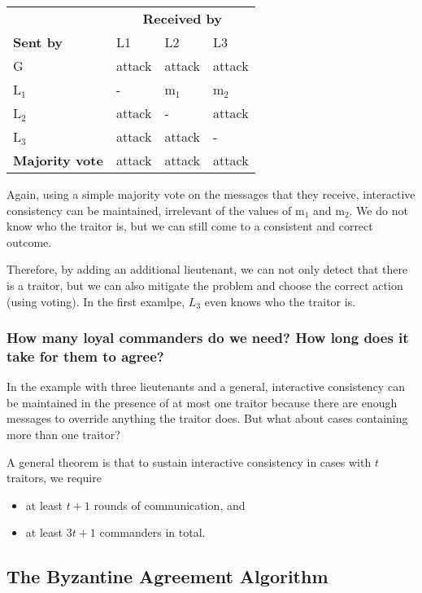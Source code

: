 \begin{center}
\begin{tabular}{llll}
 \hline
  & \multicolumn{3}{c}{{\bf Received by}}\\
 \cline{2-4}
  {\bf Sent by}  & L1 & L2 & L3\\
\hline
 G & attack & attack & attack \\
 L\(_1\) & - & m$_1$ & m$_2$ \\
 L\(_2\) & attack & - & attack \\
 L\(_3\) & attack & attack & - \\
 \hline
{\bf Majority vote} & attack & attack & attack\\
 \hline
\end{tabular}
\end{center}

Again, using a simple majority vote on the messages that they receive,  interactive consistency can be maintained, irrelevant of the values of m$_1$ and m$_2$. We do not know who the traitor is, but we can still come to a consistent and correct outcome.

Therefore, by adding an additional lieutenant, we can not only detect that there is a traitor, but we can also mitigate the problem and choose the correct action (using voting). In the first examlpe, $L_3$ even knows who the traitor is.

\subsubsection{How many loyal commanders do we need?  How long does it take for them to agree?}

In the example with three lieutenants and a general, interactive consistency can be maintained in the presence of at most one traitor because there are enough messages to override anything the traitor does. But what about cases containing more than one traitor?

A general theorem is that to sustain interactive consistency in cases with \(t\) traitors, we require

\begin{itemize}
\item at least $t+1$ rounds of communication, and
\item at least \(3t + 1\) commanders in total.
\end{itemize}

\subsection{The Byzantine Agreement Algorithm}

